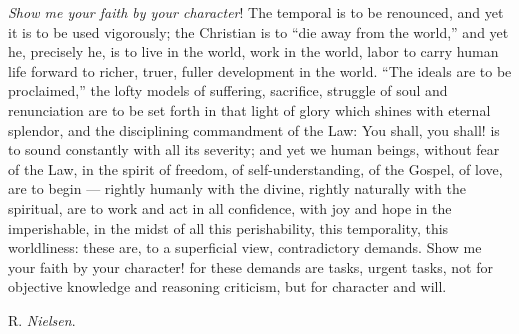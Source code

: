 \documentclass[12pt,a4paper,openany]{book}
\newcommand{\opage}[1]{\marginnote{\footnotesize\textit{[#1]}}}
\newcommand{\signature}[1]{\par\smallskip\hfill #1\hspace*{2em}\par}
\begin{document}
\emph{Show me your faith by your character}! The temporal
is to be renounced, and yet it is to be used vigorously; the
\setcounter{footnote}{0}%
\opage{517}Christian is to ``die away from the world,'' and yet he, precisely
he, is to live in the world, work in the world, labor to carry
human life forward to richer, truer, fuller development
in the world. ``The ideals are to be proclaimed,'' the lofty models
of suffering, sacrifice, struggle of soul and renunciation
are to be set forth in that light of glory which shines with eternal
splendor, and the disciplining commandment of the Law: You shall, you shall!
is to sound constantly with all its severity; and yet we
human beings, without fear of the Law, in the spirit of freedom, of self-understanding,
of the Gospel, of love, are to begin ---
rightly humanly with the divine, rightly naturally
with the spiritual, are to work and act in all confidence, with joy
and hope in the imperishable, in the midst of
all this perishability, this temporality, this
worldliness: these are, to a superficial view, contradictory
demands. Show me your faith by your character! for these
demands are tasks, urgent tasks, not for
objective knowledge and reasoning criticism, but for character
and will.
\signature{R. \emph{Nielsen}.}
\end{document}

